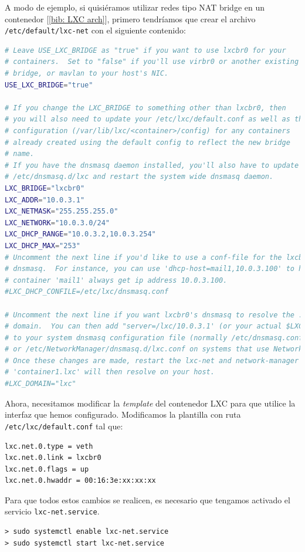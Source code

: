 \documentclass[a4paper, oneside, 12pt]{book}
\begin{document}
	\noindent A modo de ejemplo, si quisiéramos utilizar redes tipo NAT bridge en un contenedor [\ref{bib: LXC arch}], primero tendríamos que crear el archivo \texttt{/etc/default/lxc-net} con el siguiente contenido:
	\begin{lstlisting}[language=Bash, caption={Configuración interfaz NAT bridge en LXC}]
# Leave USE_LXC_BRIDGE as "true" if you want to use lxcbr0 for your
# containers.  Set to "false" if you'll use virbr0 or another existing
# bridge, or mavlan to your host's NIC.
USE_LXC_BRIDGE="true"

# If you change the LXC_BRIDGE to something other than lxcbr0, then
# you will also need to update your /etc/lxc/default.conf as well as the
# configuration (/var/lib/lxc/<container>/config) for any containers
# already created using the default config to reflect the new bridge
# name.
# If you have the dnsmasq daemon installed, you'll also have to update
# /etc/dnsmasq.d/lxc and restart the system wide dnsmasq daemon.
LXC_BRIDGE="lxcbr0"
LXC_ADDR="10.0.3.1"
LXC_NETMASK="255.255.255.0"
LXC_NETWORK="10.0.3.0/24"
LXC_DHCP_RANGE="10.0.3.2,10.0.3.254"
LXC_DHCP_MAX="253"
# Uncomment the next line if you'd like to use a conf-file for the lxcbr0
# dnsmasq.  For instance, you can use 'dhcp-host=mail1,10.0.3.100' to have
# container 'mail1' always get ip address 10.0.3.100.
#LXC_DHCP_CONFILE=/etc/lxc/dnsmasq.conf

# Uncomment the next line if you want lxcbr0's dnsmasq to resolve the .lxc
# domain.  You can then add "server=/lxc/10.0.3.1' (or your actual $LXC_ADDR)
# to your system dnsmasq configuration file (normally /etc/dnsmasq.conf,
# or /etc/NetworkManager/dnsmasq.d/lxc.conf on systems that use NetworkManager).
# Once these changes are made, restart the lxc-net and network-manager services.
# 'container1.lxc' will then resolve on your host.
#LXC_DOMAIN="lxc"
	\end{lstlisting}

	\pagebreak

	\noindent Ahora, necesitamos modificar la \textit{template} del contenedor LXC para que utilice la interfaz que hemos configurado. Modificamos la plantilla con ruta \texttt{/etc/lxc/default.conf} tal que:
	\begin{lstlisting}[language=Bash, caption={Configuración contenedor LXC para usar NAT bridge}]
lxc.net.0.type = veth
lxc.net.0.link = lxcbr0
lxc.net.0.flags = up
lxc.net.0.hwaddr = 00:16:3e:xx:xx:xx
	\end{lstlisting}

	\noindent Para que todos estos cambios se realicen, es necesario que tengamos activado el servicio \texttt{lxc-net.service}.
	\begin{verbatim}
> sudo systemctl enable lxc-net.service
> sudo systemctl start lxc-net.service
	\end{verbatim}
\end{document}
